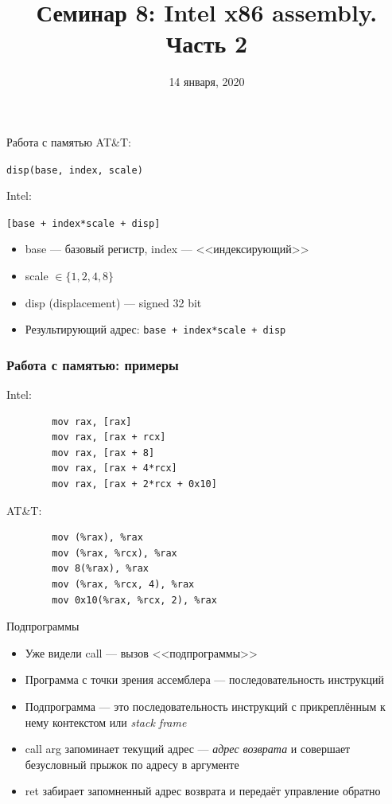 \documentclass[10pt,pdf,hyperref={unicode}]{beamer}
\title{Семинар 8: Intel x86 assembly. Часть 2}
\date{14 января, 2020}
\newcommand{\asm}[1]{\colorbox{shadecolor}{#1}}
\begin{document}
\begin{frame}
  \titlepage
\end{frame}

\begin{frame}{Работа с памятью}
        AT\&T:\\
        \begin{center}\lstinline{disp(base, index, scale)}\end{center}
        Intel:\\
        \begin{center}\lstinline{[base + index*scale + disp]}\end{center}

    \begin{itemize}
        \item base — базовый регистр, index — <<индексирующий>>
        \item scale $\in \{1, 2, 4, 8\}$
        \item disp (displacement) — signed 32 bit
        \item Результирующий адрес: \lstinline{base + index*scale + disp}
    \end{itemize}
\end{frame}

\begin{frame}[fragile]
\frametitle{Работа с памятью: примеры}
    Intel:
    \begin{verbatim}
        mov rax, [rax]
        mov rax, [rax + rcx]
        mov rax, [rax + 8]
        mov rax, [rax + 4*rcx]
        mov rax, [rax + 2*rcx + 0x10]
    \end{verbatim}

    AT\&T:
    \begin{verbatim}
        mov (%rax), %rax
        mov (%rax, %rcx), %rax
        mov 8(%rax), %rax
        mov (%rax, %rcx, 4), %rax
        mov 0x10(%rax, %rcx, 2), %rax
    \end{verbatim}
\end{frame}

\begin{frame}{Подпрограммы}
    \begin{itemize}
        \item Уже видели \asm{call} — вызов <<подпрограммы>>
        \item Программа с точки зрения ассемблера — последовательность инструкций
        \item Подпрограмма — это последовательность инструкций с прикреплённым к нему контекстом или \emph{stack frame}
        \item \asm{call arg} запоминает текущий адрес — \emph{адрес возврата} и совершает безусловный прыжок по адресу в аргументе
        \item \asm{ret} забирает запомненный адрес возврата и передаёт управление обратно
    \end{itemize}
\end{frame}
\end{document}
